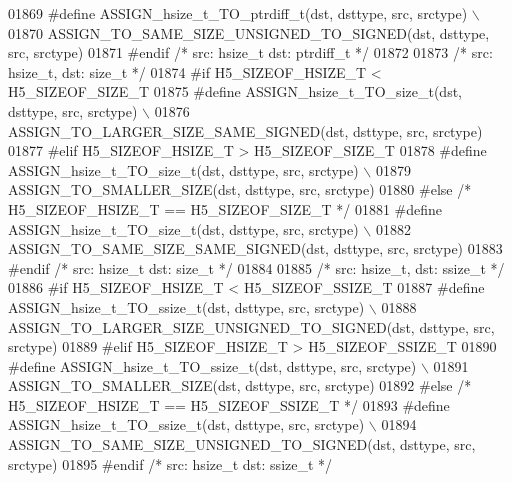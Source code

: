 \begin{DoxyCode}
01869 \textcolor{preprocessor}{    #define ASSIGN\_hsize\_t\_TO\_ptrdiff\_t(dst, dsttype, src, srctype) \(\backslash\)}
01870 \textcolor{preprocessor}{        ASSIGN\_TO\_SAME\_SIZE\_UNSIGNED\_TO\_SIGNED(dst, dsttype, src, srctype)}
01871 \textcolor{preprocessor}{#endif }\textcolor{comment}{/* src: hsize\_t dst: ptrdiff\_t */}\textcolor{preprocessor}{}
01872 
01873 \textcolor{comment}{/* src: hsize\_t, dst: size\_t */}
01874 \textcolor{preprocessor}{#if H5\_SIZEOF\_HSIZE\_T < H5\_SIZEOF\_SIZE\_T}
01875 \textcolor{preprocessor}{    #define ASSIGN\_hsize\_t\_TO\_size\_t(dst, dsttype, src, srctype) \(\backslash\)}
01876 \textcolor{preprocessor}{        ASSIGN\_TO\_LARGER\_SIZE\_SAME\_SIGNED(dst, dsttype, src, srctype)}
01877 \textcolor{preprocessor}{#elif H5\_SIZEOF\_HSIZE\_T > H5\_SIZEOF\_SIZE\_T}
01878 \textcolor{preprocessor}{    #define ASSIGN\_hsize\_t\_TO\_size\_t(dst, dsttype, src, srctype) \(\backslash\)}
01879 \textcolor{preprocessor}{        ASSIGN\_TO\_SMALLER\_SIZE(dst, dsttype, src, srctype)}
01880 \textcolor{preprocessor}{#else }\textcolor{comment}{/* H5\_SIZEOF\_HSIZE\_T == H5\_SIZEOF\_SIZE\_T */}\textcolor{preprocessor}{}
01881 \textcolor{preprocessor}{    #define ASSIGN\_hsize\_t\_TO\_size\_t(dst, dsttype, src, srctype) \(\backslash\)}
01882 \textcolor{preprocessor}{        ASSIGN\_TO\_SAME\_SIZE\_SAME\_SIGNED(dst, dsttype, src, srctype)}
01883 \textcolor{preprocessor}{#endif }\textcolor{comment}{/* src: hsize\_t dst: size\_t */}\textcolor{preprocessor}{}
01884 
01885 \textcolor{comment}{/* src: hsize\_t, dst: ssize\_t */}
01886 \textcolor{preprocessor}{#if H5\_SIZEOF\_HSIZE\_T < H5\_SIZEOF\_SSIZE\_T}
01887 \textcolor{preprocessor}{    #define ASSIGN\_hsize\_t\_TO\_ssize\_t(dst, dsttype, src, srctype) \(\backslash\)}
01888 \textcolor{preprocessor}{        ASSIGN\_TO\_LARGER\_SIZE\_UNSIGNED\_TO\_SIGNED(dst, dsttype, src, srctype)}
01889 \textcolor{preprocessor}{#elif H5\_SIZEOF\_HSIZE\_T > H5\_SIZEOF\_SSIZE\_T}
01890 \textcolor{preprocessor}{    #define ASSIGN\_hsize\_t\_TO\_ssize\_t(dst, dsttype, src, srctype) \(\backslash\)}
01891 \textcolor{preprocessor}{        ASSIGN\_TO\_SMALLER\_SIZE(dst, dsttype, src, srctype)}
01892 \textcolor{preprocessor}{#else }\textcolor{comment}{/* H5\_SIZEOF\_HSIZE\_T == H5\_SIZEOF\_SSIZE\_T */}\textcolor{preprocessor}{}
01893 \textcolor{preprocessor}{    #define ASSIGN\_hsize\_t\_TO\_ssize\_t(dst, dsttype, src, srctype) \(\backslash\)}
01894 \textcolor{preprocessor}{        ASSIGN\_TO\_SAME\_SIZE\_UNSIGNED\_TO\_SIGNED(dst, dsttype, src, srctype)}
01895 \textcolor{preprocessor}{#endif }\textcolor{comment}{/* src: hsize\_t dst: ssize\_t */}\textcolor{preprocessor}{}

\end{DoxyCode}
